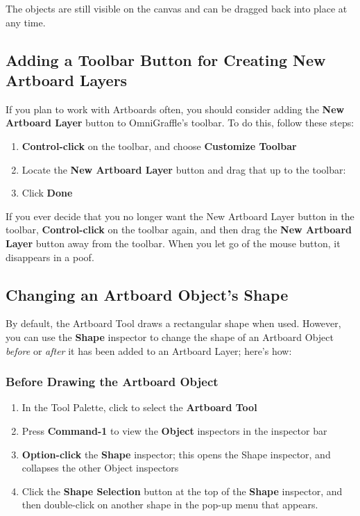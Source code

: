 \documentclass[../main.tex]{subfiles}
\begin{document}

The objects are still visible on the canvas and can be dragged back into place at any time.

\subsection{Adding a Toolbar Button for Creating New Artboard Layers}

If you plan to work with Artboards often, you should consider adding the \textbf{New Artboard
Layer} button to OmniGraffle's toolbar. To do this, follow these steps:

\begin{enumerate}
  \item \textbf{Control-click} on the toolbar, and choose \textbf{Customize Toolbar}
  \item Locate the \textbf{New Artboard Layer} button and drag that up to the toolbar:


  \item Click \textbf{Done}
\end{enumerate}

If you ever decide that you no longer want the New Artboard Layer button in the toolbar,
\textbf{Control-click} on the toolbar again, and then drag the \textbf{New Artboard Layer}
button away from the toolbar. When you let go of the mouse button, it disappears in a poof.

\subsection{Changing an Artboard Object's Shape}

By default, the Artboard Tool draws a rectangular shape when used. However, you can use the
\textbf{Shape} inspector to change the shape of an Artboard Object \textit{before} or
\textit{after} it has been added to an Artboard Layer; here's how:

\subsubsection{Before Drawing the Artboard Object}

\begin{enumerate}
  \item In the Tool Palette, click to select the \textbf{Artboard Tool}
  \item Press \textbf{Command-1} to view the \textbf{Object} inspectors in the inspector bar
  \item \textbf{Option-click} the \textbf{Shape} inspector; this opens the Shape inspector, and
    collapses the other Object inspectors
  \item Click the \textbf{Shape Selection} button at the top of the \textbf{Shape} inspector,
    and then double-click on another shape in the pop-up menu that appears.
\end{enumerate}
\end{document}
